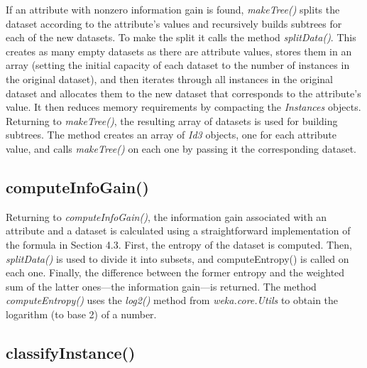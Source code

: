 If an attribute with nonzero information gain is found, \textit{makeTree()}
splits the dataset according to the attribute's values and recursively
builds subtrees for each of the new datasets. To make the split it
calls the method \textit{splitData()}. This creates as many empty datasets as
there are attribute values, stores them in an array (setting the
initial capacity of each dataset to the number of instances in the
original dataset), and then iterates through all instances in the
original dataset and allocates them to the new dataset that
corresponds to the attribute's value. It then reduces memory
requirements by compacting the \textit{Instances} objects. Returning to
\textit{makeTree()}, the resulting array of datasets is used for building
subtrees. The method creates an array of \textit{Id3} objects, one for
each attribute value, and calls \textit{makeTree()} on each one by
passing it the corresponding dataset.

\subsection{computeInfoGain()}

Returning to \textit{computeInfoGain()}, the information gain
associated with an attribute and a dataset is calculated using a
straightforward implementation of the formula in Section 4.3. First,
the entropy of the dataset is computed. Then, \textit{splitData()} is
used to divide it into subsets, and computeEntropy() is called on each
one. Finally, the difference between the former entropy and the
weighted sum of the latter ones---the information gain---is
returned. The method \textit{computeEntropy()} uses
the \textit{log2()} method from \textit{weka.core.Utils} to obtain the
logarithm (to base 2) of a number.

\subsection{classifyInstance()}

